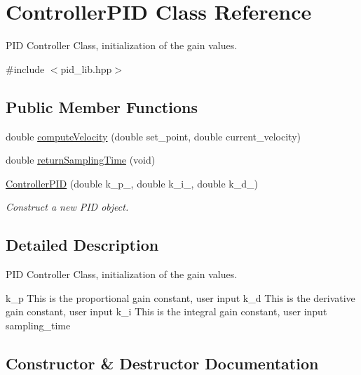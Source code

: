 \hypertarget{class_controller_p_i_d}{}\section{Controller\+P\+ID Class Reference}
\label{class_controller_p_i_d}


P\+ID Controller Class, initialization of the gain values.  




{\ttfamily \#include $<$pid\+\_\+lib.\+hpp$>$}

\subsection*{Public Member Functions}
\begin{DoxyCompactItemize}
\item 
double \hyperlink{class_controller_p_i_d_a65bb68a133b87f5b4bd78c22c48c8b68}{compute\+Velocity} (double set\+\_\+point, double current\+\_\+velocity)
\item 
double \hyperlink{class_controller_p_i_d_ab787e05af656c81fdc02fa4311a4cc7d}{return\+Sampling\+Time} (void)
\item 
\hyperlink{class_controller_p_i_d_a16e8aed0cbf56add9eaf137b89acd22b}{Controller\+P\+ID} (double k\+\_\+p\+\_\+, double k\+\_\+i\+\_\+, double k\+\_\+d\+\_\+)
\begin{DoxyCompactList}\small\item\em Construct a new P\+ID object. \end{DoxyCompactList}\end{DoxyCompactItemize}


\subsection{Detailed Description}
P\+ID Controller Class, initialization of the gain values. 

k\+\_\+p This is the proportional gain constant, user input  k\+\_\+d This is the derivative gain constant, user input  k\+\_\+i This is the integral gain constant, user input  sampling\+\_\+time 

\subsection{Constructor \& Destructor Documentation}
\mbox{\label{class_controller_p_i_d_a16e8aed0cbf56add9eaf137b89acd22b}} 
